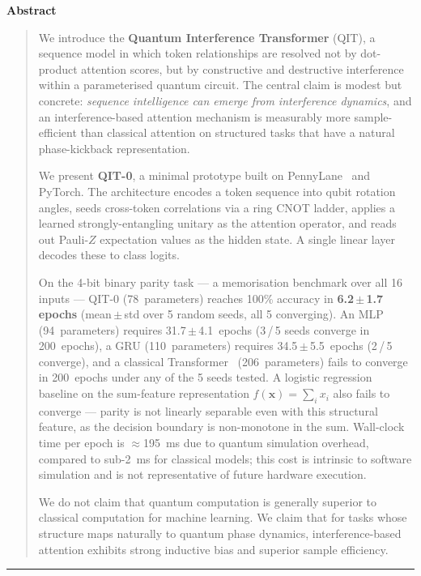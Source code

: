 \documentclass[11pt,a4paper]{article}
\renewenvironment{abstract}{%
  \small\begin{center}\textbf{Abstract}\end{center}%
  \begin{quotation}\noindent}{\end{quotation}}
\begin{document}
\begin{abstract}
We introduce the \textbf{Quantum Interference Transformer} (QIT), a sequence model
in which token relationships are resolved not by dot-product attention scores, but by
constructive and destructive interference within a parameterised quantum circuit.
The central claim is modest but concrete: \emph{sequence intelligence can emerge from
interference dynamics}, and an interference-based attention mechanism is measurably
more sample-efficient than classical attention on structured tasks that have a natural
phase-kickback representation.

We present \textbf{QIT-0}, a minimal prototype built on PennyLane~\cite{bergholm2018pennylane}
and PyTorch. The architecture encodes a token sequence into qubit rotation angles,
seeds cross-token correlations via a ring CNOT ladder, applies a learned
strongly-entangling unitary as the attention operator, and reads out Pauli-$Z$
expectation values as the hidden state. A single linear layer decodes these to class logits.

On the 4-bit binary parity task --- a memorisation benchmark over all 16 inputs ---
QIT-0 (78~parameters) reaches 100\% accuracy in \textbf{6.2\,$\pm$\,1.7 epochs}
(mean\,$\pm$\,std over 5 random seeds, all 5 converging).
An MLP (94~parameters) requires 31.7\,$\pm$\,4.1~epochs (3\,/\,5 seeds converge in 200~epochs),
a GRU (110~parameters) requires 34.5\,$\pm$\,5.5~epochs (2\,/\,5 converge),
and a classical Transformer~\cite{vaswani2017attention} (206~parameters) fails to converge
in 200~epochs under any of the 5 seeds tested.
A logistic regression baseline on the sum-feature representation
$f(\mathbf{x}) = \sum_i x_i$ also fails to converge --- parity is not linearly separable
even with this structural feature, as the decision boundary is non-monotone in the sum.
Wall-clock time per epoch is $\approx$195~ms due to quantum simulation overhead,
compared to sub-2~ms for classical models; this cost is intrinsic to software simulation
and is not representative of future hardware execution.

We do not claim that quantum computation is generally superior to classical computation
for machine learning. We claim that for tasks whose structure maps naturally to quantum
phase dynamics, interference-based attention exhibits strong inductive bias and
superior sample efficiency.
\end{abstract}

\vspace{1em}
\hrule
\vspace{1em}
\end{document}
